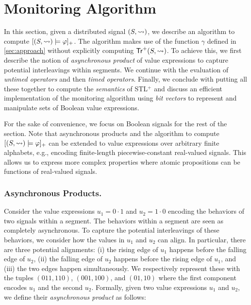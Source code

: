 \section{Monitoring Algorithm} 
\label{sec:algorithm}

In this section, given a distributed signal $(S,{\rightsquigarrow})$, we describe an algorithm to compute 
$[(S,{\rightsquigarrow}) \models \varphi]_+$.
The algorithm makes use of the function $\gamma$ defined in \cref{sec:approach} without explicitly computing $\mathsf{Tr}^+(S,{\rightsquigarrow})$.
To achieve this, we first describe the notion of \emph{asynchronous product} of value expressions to capture potential interleavings within segments.
We continue with the evaluation of \emph{untimed operators} and then \emph{timed operators}.
Finally, we conclude with putting all these together to compute the \emph{semantics} of STL$^+$ 
and discuss an efficient implementation of the monitoring algorithm using \emph{bit vectors} to 
represent and manipulate sets of Boolean value expressions.

\begin{remark}
	For the sake of convenience, we focus on Boolean signals for the rest of the section.
	Note that asynchronous products and the algorithm to compute $[(S,{\rightsquigarrow}) \models \varphi]_+$ can be extended to value expressions over arbitrary finite alphabets, e.g., encoding finite-length piecewise-constant real-valued signals.
	This allows us to express more complex properties where atomic propositions can be functions of real-valued signals.
\end{remark}

\subsubsection{Asynchronous Products.}
Consider the value expressions $u_1 = 0 \cdot 1$ and $u_2 = 1 \cdot 0$ encoding the behaviors of two signals within a segment.
The behaviors within a segment are seen as completely asynchronous.
To capture the potential interleavings of these behaviors, we consider how the values in $u_1$ and $u_2$ can align.
In particular, there are three potential alignments:
(i) the rising edge of $u_1$ happens before the falling edge of $u_2$,
(ii) the falling edge of $u_2$ happens before the rising edge of $u_1$, and
(iii) the two edges happen simultaneously.
We respectively represent these with the tuples $(011, 110)$, $(001, 100)$, and $(01, 10)$ where the first component encodes $u_1$ and the second $u_2$.
Formally, given two value expressions $u_1$ and $u_2$, we define their \emph{asynchronous product} as follows:

